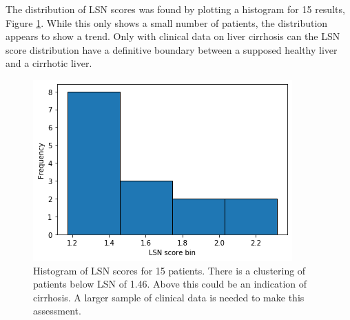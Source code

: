 \documentclass[12pt]{article}
\begin{document}
The distribution of LSN scores was found by plotting a histogram for 15 results, Figure \ref{fig:histogram}. While this only shows a small number of patients, the distribution appears to show a trend. Only with clinical data on liver cirrhosis can the LSN score distribution have a definitive boundary between a supposed healthy liver and a cirrhotic liver.

\begin{figure}
    \centering
    
    \includegraphics[width=0.8\linewidth]{graphics/histogram.png}
    \caption{Histogram of LSN scores for 15 patients. There is a clustering of patients below LSN of 1.46. Above this could be an indication of cirrhosis. A larger sample of clinical data is needed to make this assessment.}

    \label{fig:histogram}
\end{figure}
\end{document}
